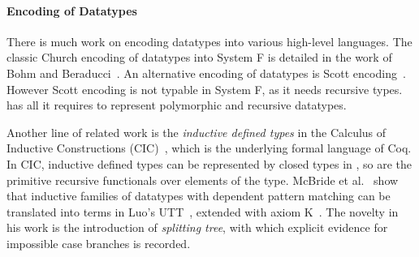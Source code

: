 \paragraph{Encoding of Datatypes}
There is much work on encoding datatypes into various high-level
languages. The classic Church encoding of datatypes into System F is
detailed in the work of Bohm and Beraducci~\cite{Bohm1985}.  An
alternative encoding of datatypes is Scott
encoding~\cite{encoding:scott}. However Scott encoding is not typable
in System F, as it needs recursive types. \name has all it requires to
represent polymorphic and recursive datatypes.

Another line of related work is the \emph{inductive defined types} in
the Calculus of Inductive Constructions (CIC)~\cite{cic}, which is the
underlying formal language of Coq. In CIC, inductive defined types can
be represented by closed types in \coc, so are the primitive recursive
functionals over elements of the type. McBride et
al.~\cite{elim:pi:pattern} show that inductive families of datatypes
with dependent pattern matching can be translated into terms in Luo's
UTT~\cite{Luo:UTT}, extended with axiom K~\cite{axiomK}. The novelty
in his work is the introduction of \emph{splitting tree}, with which
explicit evidence for impossible case branches is recorded.
